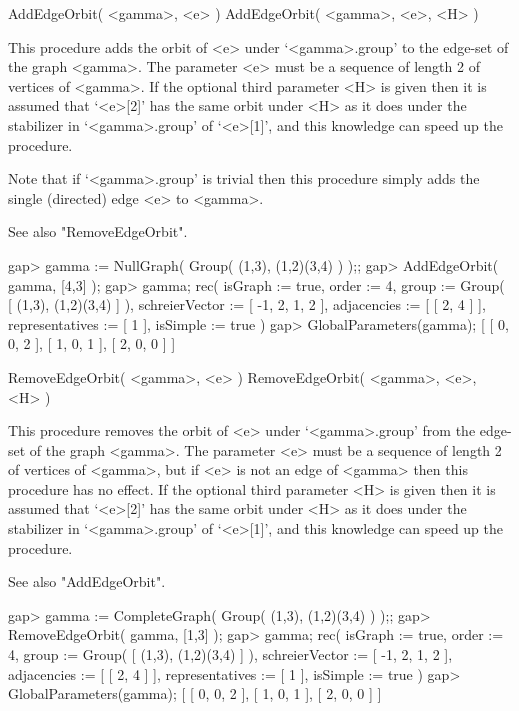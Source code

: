
\>AddEdgeOrbit( <gamma>, <e> )
\>AddEdgeOrbit( <gamma>, <e>, <H> )

This procedure adds the orbit of <e> under `<gamma>.group' to the
edge-set of the graph <gamma>. The parameter <e> must be a sequence of
length 2 of vertices of <gamma>. If the optional third parameter <H> is
given then it is assumed that `<e>[2]' has the same orbit under <H> as
it does under the stabilizer in `<gamma>.group' of `<e>[1]', and this
knowledge can speed up the procedure.

Note that if `<gamma>.group' is trivial then this procedure simply adds the
single (directed) edge <e> to <gamma>.

See also "RemoveEdgeOrbit".

\beginexample
gap> gamma := NullGraph( Group( (1,3), (1,2)(3,4) ) );;
gap> AddEdgeOrbit( gamma, [4,3] );
gap> gamma;
rec(
  isGraph := true,
  order := 4,
  group := Group( [ (1,3), (1,2)(3,4) ] ),
  schreierVector := [ -1, 2, 1, 2 ],
  adjacencies := [ [ 2, 4 ] ],
  representatives := [ 1 ],
  isSimple := true )
gap> GlobalParameters(gamma);
[ [ 0, 0, 2 ], [ 1, 0, 1 ], [ 2, 0, 0 ] ]
\endexample


\>RemoveEdgeOrbit( <gamma>, <e> )
\>RemoveEdgeOrbit( <gamma>, <e>, <H> )

This procedure removes the orbit of <e> under `<gamma>.group' from the
edge-set of the graph <gamma>. The parameter <e> must be a sequence of
length 2 of vertices of <gamma>, but if <e> is not an edge of <gamma>
then this procedure has no effect. If the optional third parameter <H>
is given then it is assumed that `<e>[2]' has the same orbit under <H>
as it does under the stabilizer in `<gamma>.group' of `<e>[1]', and
this knowledge can speed up the procedure.

See also "AddEdgeOrbit".

\beginexample
gap> gamma := CompleteGraph( Group( (1,3), (1,2)(3,4) ) );;
gap> RemoveEdgeOrbit( gamma, [1,3] );
gap> gamma;
rec(
  isGraph := true,
  order := 4,
  group := Group( [ (1,3), (1,2)(3,4) ] ),
  schreierVector := [ -1, 2, 1, 2 ],
  adjacencies := [ [ 2, 4 ] ],
  representatives := [ 1 ],
  isSimple := true )
gap> GlobalParameters(gamma);
[ [ 0, 0, 2 ], [ 1, 0, 1 ], [ 2, 0, 0 ] ]
\endexample

